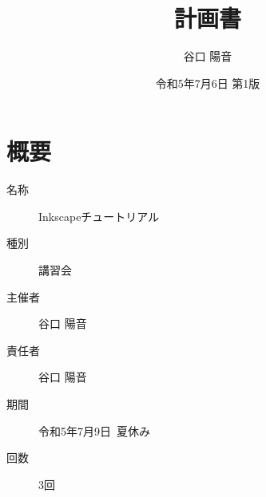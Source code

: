 \documentclass{ltjsarticle}
\begin{document}
    \title{計画書}
\author{谷口 陽音}
\date{令和5年7月6日 第1版}
\maketitle



\section*{概要}
\begin{Large}
\begin{description}
    \item[名称] Inkscapeチュートリアル
    \item[種別] 講習会
    \item[主催者] 谷口 陽音
    \item[責任者] 谷口 陽音
    \item[期間] 令和5年7月9日~夏休み
    \item[回数] 3回  
\end{description}
\end{Large}
\newpage
\end{document}
